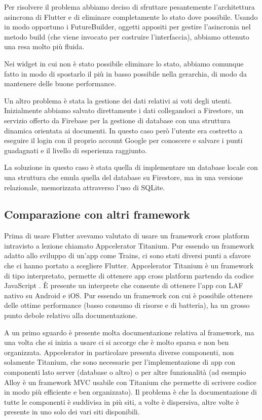 Per risolvere il problema abbiamo deciso di sfruttare pesantemente l'architettura asincrona di Flutter e di eliminare completamente lo stato dove possibile.
Usando in modo opportuno i FutureBuilder, oggetti appositi per gestire l'asincronia nel metodo build (che viene invocato per costruire l'interfaccia), abbiamo ottenuto una resa molto più fluida.

Nei widget in cui non è stato possibile eliminare lo stato, abbiamo comunque fatto in modo di spostarlo il più in basso possibile nella gerarchia, di modo da mantenere delle buone performance.

Un altro problema è stata la gestione dei dati relativi ai voti degli utenti.
Inizialmente abbiamo salvato direttamente i dati collegandoci a Firestore, un servizio offerto da Firebase per la gestione di database con una struttura dinamica orientata ai documenti.
In questo caso però l'utente era costretto a eseguire il login con il proprio account Google per conoscere e salvare i punti guadagnati e il livello di esperienza raggiunto.

La soluzione in questo caso è stata quella di implementare un database locale con una struttura che emula quella del database su Firestore, ma in una versione relazionale, memorizzata attraverso l'uso di SQLite.

\subsection{Comparazione con altri framework\label{sec:flutter-comparazione}}
Prima di usare Flutter avevamo valutato di usare un framework cross platform intravisto a lezione chiamato Appcelerator Titanium.
Pur essendo un framework adatto allo sviluppo di un'app come Trains, ci sono stati diversi punti a sfavore che ci hanno portato a scegliere Flutter.
Appcelerator Titanium è un framework di tipo interpretato, permette di ottenere app cross platform partendo da codice JavaScript \parencite{gaggi:framework}.
È presente un interprete che consente di ottenere l'app con LAF nativo su Android e iOS.
Pur essendo un framework con cui è possibile ottenere delle ottime performance (basso consumo di risorse e di batteria), ha un grosso punto debole relativo alla documentazione.

A un primo sguardo è presente molta documentazione relativa al framework, ma una volta che si inizia a usare ci si accorge che è molto sparsa e non ben organizzata.
Appcelerator in particolare presenta diverse componenti, non solamente Titanium, che sono necessarie per l'implementazione di app con componenti lato server (database o altro) o per altre funzionalità (ad esempio Alloy è un framework MVC usabile con Titanium che permette di scrivere codice in modo più efficiente e ben organizzato).
Il problema è che la documentazione di tutte le componenti è suddivisa in più siti, a volte è dispersiva, altre volte è presente in uno solo dei vari siti disponibili.

